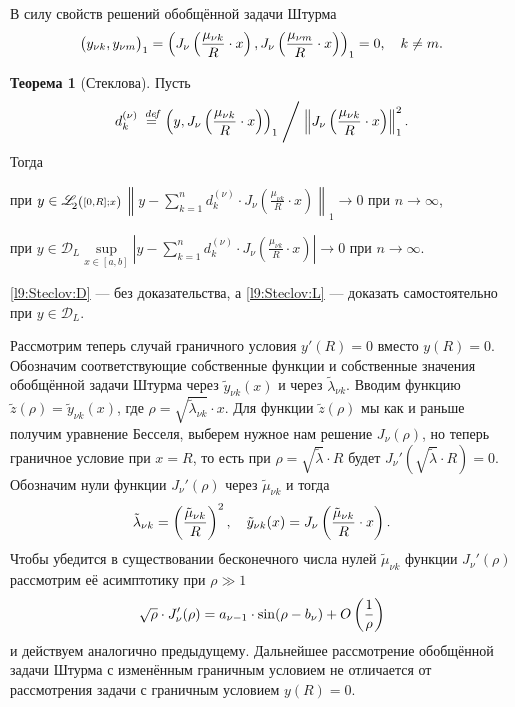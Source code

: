 \documentclass[12pt,a4paper,openany,fleqn]{book}
\newcommand {\defeq}{\stackrel{\hspace{0.09 cm}de\!f}{=}}
\newcommand {\eqdef}{\defeq}
\newcommand{\mc}[1]{\ensuremath{\mathcal{#1}}}
\newcommand{\norm}[1]{\ensuremath{\left\|#1\right\|}}
\newcommand{\fLr}[1][{[a,b];\rho}]{\ensuremath{\mathscr{L}\hspace*{-0.11 cm}{\mathstrut}_{2}{\scriptstyle\left(\vphantom{A^b}#1\right)}}}
\theoremstyle{definition}
\newtheorem{_teor}{Теорема}[section]
\begin{document}
	В силу свойств решений обобщённой задачи Штурма 
	\begin{equation*}
		\hfill\big(y_{\nu k},y_{\nu m}\big)_1=\left(J_{\nu}\left(\frac{\mu_{\nu k}}{R}\cdot x\right),J_{\nu}\left(\frac{\mu_{\nu m}}{R}\cdot x\right)\right)_1=0,\quad k\neq m.\hfill
	\end{equation*}
	\begin{_teor}[Стеклова]
		Пусть
		\begin{equation*}
			\hfill d_k^{(\nu)}\eqdef\left(y,J_{\nu}\left(\frac{\mu_{\nu k}}{R}\cdot x\right)\right)_1\Biggm/\norm{J_{\nu}\left(\frac{\mu_{\nu k}}{R}\cdot x\right)}_1^2.\hfill
		\end{equation*} 
		Тогда 
		\begin{enumerateP1}
			\item\label{l9:Steclov:L}при $y\in\fLr[{[0,R];x}]$\quad $\displaystyle\norm{y-\sum\limits_{k=1}^{n}d_k^{(\nu)}\cdot J_{\nu}\left(\frac{\mu_{\nu k}}{R}\cdot x\right)}_1\to0$ при $n\to\infty$,
			\item\label{l9:Steclov:D}при $y\in\mc{D}_L$\quad$\displaystyle\sup\limits_{x\in[a,b]}\left|y-\sum\limits_{k=1}^{n}d_k^{(\nu)}\cdot J_{\nu}\left(\frac{\mu_{\nu k}}{R}\cdot x\right)\right|\to0$ при $n\to\infty$. 
		\end{enumerateP1} 
	\end{_teor}
	\noindent\ref{l9:Steclov:D} --- без доказательства, а \ref{l9:Steclov:L} --- доказать самостоятельно при $y\in\mc{D}_L$. 
	
	Рассмотрим теперь случай граничного условия $y'(R)=0$ вместо $y(R)=0$. Обозначим соответствующие собственные функции и собственные значения обобщённой задачи Штурма через $\tilde{y}_{\nu k}(x)$ и через $\tilde{\lambda}_{\nu k}$. Вводим функцию $\tilde{z}(\rho)=\tilde{y}_{\nu k}(x)$, где $\rho=\sqrt{\tilde{\lambda}_{\nu k}}\cdot x$. Для функции $\tilde{z}(\rho)$ мы как и раньше получим уравнение Бесселя, выберем нужное нам решение $J_{\nu}(\rho)$, но теперь граничное условие при $x=R$, то есть при $\rho=\sqrt{\tilde{\lambda}}\cdot R$ будет $J_{\nu}'\left(\sqrt{\tilde{\lambda}}\cdot R\right)=0$. Обозначим нули функции $J_{\nu}'(\rho)$ через $\tilde{\mu}_{\nu k}$ и тогда 
	\begin{equation*}
		\hfill\tilde{\lambda}_{\nu k}=\left(\frac{\tilde{\mu}_{\nu k}}{R}\right)^2,\quad \tilde{y}_{\nu k}(x)=J_{\nu}\left(\frac{\tilde{\mu}_{\nu k}}{R}\cdot x\right).\hfill
	\end{equation*}
	Чтобы убедится в существовании бесконечного числа нулей $\tilde{\mu}_{\nu k}$ функции $J_{\nu}'(\rho)$ рассмотрим её асимптотику при $\rho\gg1$
	\begin{equation*}
		\hfill\sqrt{\rho}\cdot J_{\nu}'(\rho)=a_{\nu-1}\cdot\sin(\rho-b_{\nu})+O\left(\frac{1}{\rho}\right)\hfill
	\end{equation*}
	и действуем аналогично предыдущему. Дальнейшее рассмотрение обобщённой задачи Штурма с изменённым граничным условием не отличается от рассмотрения задачи с граничным условием $y(R)=0$.
	
\end{document}
